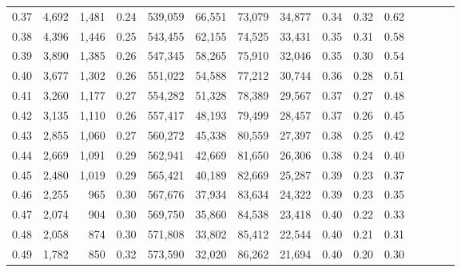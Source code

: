 \begin{tabular}{rrrcrrrrrrrrrrr}
0.37 &   4,692 &  1,481 &                                       0.24 &  539,059 &   66,551 &   73,079 &   34,877 &  0.34 &  0.32 &                         0.62 \\
0.38 &   4,396 &  1,446 &                                       0.25 &  543,455 &   62,155 &   74,525 &   33,431 &  0.35 &  0.31 &                         0.58 \\
0.39 &   3,890 &  1,385 &                                       0.26 &  547,345 &   58,265 &   75,910 &   32,046 &  0.35 &  0.30 &                         0.54 \\
0.40 &   3,677 &  1,302 &                                       0.26 &  551,022 &   54,588 &   77,212 &   30,744 &  0.36 &  0.28 &                         0.51 \\
0.41 &   3,260 &  1,177 &                                       0.27 &  554,282 &   51,328 &   78,389 &   29,567 &  0.37 &  0.27 &                         0.48 \\
0.42 &   3,135 &  1,110 &                                       0.26 &  557,417 &   48,193 &   79,499 &   28,457 &  0.37 &  0.26 &                         0.45 \\
0.43 &   2,855 &  1,060 &                                       0.27 &  560,272 &   45,338 &   80,559 &   27,397 &  0.38 &  0.25 &                         0.42 \\
0.44 &   2,669 &  1,091 &                                       0.29 &  562,941 &   42,669 &   81,650 &   26,306 &  0.38 &  0.24 &                         0.40 \\
0.45 &   2,480 &  1,019 &                                       0.29 &  565,421 &   40,189 &   82,669 &   25,287 &  0.39 &  0.23 &                         0.37 \\
0.46 &   2,255 &    965 &                                       0.30 &  567,676 &   37,934 &   83,634 &   24,322 &  0.39 &  0.23 &                         0.35 \\
0.47 &   2,074 &    904 &                                       0.30 &  569,750 &   35,860 &   84,538 &   23,418 &  0.40 &  0.22 &                         0.33 \\
0.48 &   2,058 &    874 &                                       0.30 &  571,808 &   33,802 &   85,412 &   22,544 &  0.40 &  0.21 &                         0.31 \\
0.49 &   1,782 &    850 &                                       0.32 &  573,590 &   32,020 &   86,262 &   21,694 &  0.40 &  0.20 &                         0.30 \\

\end{tabular}
